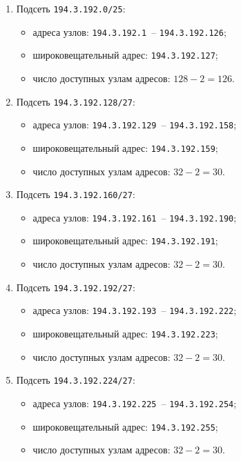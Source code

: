 \begin{enumerate}
	\item Подсеть \texttt{194.3.192.0/25}:
	\begin{itemize}
		\item адреса узлов: \texttt{194.3.192.1}~-- \texttt{194.3.192.126};
		\item широковещательный адрес: \texttt{194.3.192.127};
		\item число доступных узлам адресов: $128 - 2 = 126$.
	\end{itemize}

	\item Подсеть \texttt{194.3.192.128/27}:
	\begin{itemize}
		\item адреса узлов: \texttt{194.3.192.129}~-- \texttt{194.3.192.158};
		\item широковещательный адрес: \texttt{194.3.192.159};
		\item число доступных узлам адресов: $32 - 2 = 30$.
	\end{itemize}

	\item Подсеть \texttt{194.3.192.160/27}:
	\begin{itemize}
		\item адреса узлов: \texttt{194.3.192.161}~-- \texttt{194.3.192.190};
		\item широковещательный адрес: \texttt{194.3.192.191};
		\item число доступных узлам адресов: $32 - 2 = 30$.
	\end{itemize}

	\item Подсеть \texttt{194.3.192.192/27}:
	\begin{itemize}
		\item адреса узлов: \texttt{194.3.192.193}~-- \texttt{194.3.192.222};
		\item широковещательный адрес: \texttt{194.3.192.223};
		\item число доступных узлам адресов: $32 - 2 = 30$.
	\end{itemize}

	\item Подсеть \texttt{194.3.192.224/27}:
	\begin{itemize}
		\item адреса узлов: \texttt{194.3.192.225}~-- \texttt{194.3.192.254};
		\item широковещательный адрес: \texttt{194.3.192.255};
		\item число доступных узлам адресов: $32 - 2 = 30$.
	\end{itemize}
\end{enumerate}

